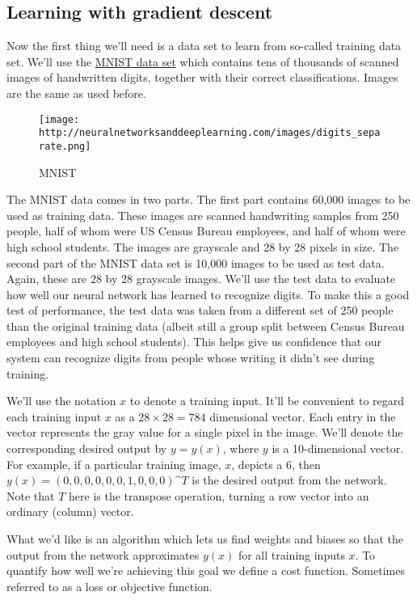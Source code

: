 \documentclass[]{article}
\begin{document}
\subsection{Learning with gradient
descent}\label{learning-with-gradient-descent}

Now the first thing we'll need is a data set to learn from so-called
training data set. We'll use the
\href{http://yann.lecun.com/exdb/mnist/}{MNIST data set} which contains
tens of thousands of scanned images of handwritten digits, together with
their correct classifications. Images are the same as used before.

\begin{figure}[htbp]
\centering
\texttt{[image: http://neuralnetworksanddeeplearning.com/images/digits\_separate.png]}
\caption{MNIST}
\end{figure}

The MNIST data comes in two parts. The first part contains 60,000 images
to be used as training data. These images are scanned handwriting
samples from 250 people, half of whom were US Census Bureau employees,
and half of whom were high school students. The images are grayscale and
28 by 28 pixels in size. The second part of the MNIST data set is 10,000
images to be used as test data. Again, these are 28 by 28 grayscale
images. We'll use the test data to evaluate how well our neural network
has learned to recognize digits. To make this a good test of
performance, the test data was taken from a different set of 250 people
than the original training data (albeit still a group split between
Census Bureau employees and high school students). This helps give us
confidence that our system can recognize digits from people whose
writing it didn't see during training.

We'll use the notation $ x $ to denote a training input. It'll be
convenient to regard each training input $ x $ as a $ 28 \times 28 =
784 $ dimensional vector. Each entry in the vector represents the gray
value for a single pixel in the image. We'll denote the corresponding
desired output by $ y = y(x) $, where $ y $ is a 10-dimensional
vector. For example, if a particular training image, $ x
$, depicts a 6, then $ y(x)=(0,0,0,0,0,0,1,0,0,0) \^{} T $ is the
desired output from the network. Note that $ T $ here is the transpose
operation, turning a row vector into an ordinary (column) vector.

What we'd like is an algorithm which lets us find weights and biases so
that the output from the network approximates $ y(x) $ for all
training inputs $ x $. To quantify how well we're achieving this goal
we define a cost function. Sometimes referred to as a loss or objective
function.
\end{document}
